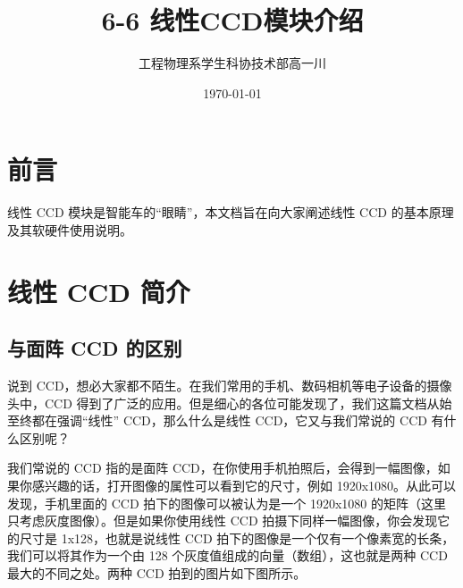 
\graphicspath{{./img/ccd/}{./img/}}




\title{6-6 线性CCD模块介绍}
\author{工程物理系学生科协技术部\quad 高一川}
\date{\today}
\maketitle
\tableofcontents
\newpage


\section{前言}
线性 CCD 模块是智能车的“眼睛”，本文档旨在向大家阐述线性 CCD 的基本原理及其软硬件使用说明。

\section{线性 CCD 简介}

\subsection{与面阵 CCD 的区别}

说到 CCD，想必大家都不陌生。在我们常用的手机、数码相机等电子设备的摄像头中，CCD 得到了广泛的应用。但是细心的各位可能发现了，我们这篇文档从始至终都在强调“线性” CCD，那么什么是线性 CCD，它又与我们常说的 CCD 有什么区别呢？

我们常说的 CCD 指的是面阵 CCD，在你使用手机拍照后，会得到一幅图像，如果你感兴趣的话，打开图像的属性可以看到它的尺寸，例如 1920x1080。从此可以发现，手机里面的 CCD 拍下的图像可以被认为是一个 1920x1080 的矩阵（这里只考虑灰度图像）。但是如果你使用线性 CCD 拍摄下同样一幅图像，你会发现它的尺寸是 1x128，也就是说线性 CCD 拍下的图像是一个仅有一个像素宽的长条，我们可以将其作为一个由 128 个灰度值组成的向量（数组），这也就是两种 CCD 最大的不同之处。两种 CCD 拍到的图片如下图所示。

